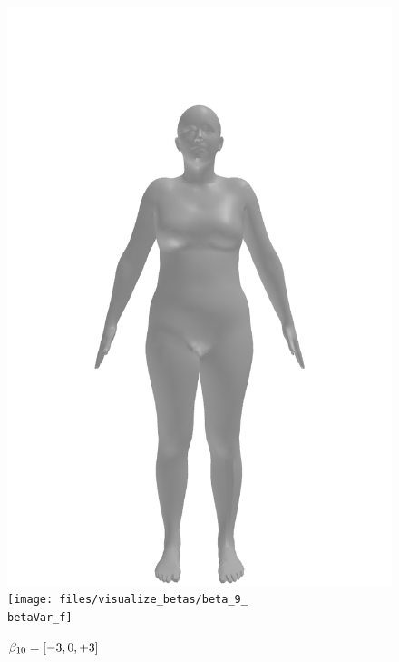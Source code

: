 \begin{figure}[ht!]
\begin{minipage}[b]{\textwidth}
        \includegraphics[width=\imgWidth]{files/visualize_betas/baseline_f}
        \texttt{[image: files/visualize\_betas/beta\_9\_\\betaVar\_f]}
        \caption{$\beta_{10} = [-3, 0, +3]$}
    \end{minipage}
\end{figure}
